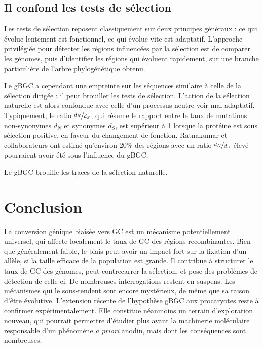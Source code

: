 \documentclass[11pt, oneside]{scrartcl}
\begin{document}
\subsection{Il confond les tests de sélection}
\label{sec:orgheadline16}
Les tests de sélection reposent classiquement sur deux principes généraux
\cite{hurst_genetics_2009} : ce qui évolue lentement est fonctionnel, ce qui
évolue vite est adaptatif. L'approche privilégiée pour détecter les régions
influencées par la sélection est de comparer les génomes, puis d'identifier les
régions qui évoluent rapidement, sur une branche particulière de l'arbre
phylogénétique obtenu\cite{ratnakumar_detecting_2010}.

Le gBGC a cependant une empreinte sur les séquences similaire à celle de la
sélection dirigée : il peut brouiller les tests de sélection. L'action de la
sélection naturelle est alors confondue avec celle d'un processus neutre voir
mal-adaptatif. Typiquement, le ratio \(\nicefrac{d_N}{d_S}\), qui résume le
rapport entre le taux de mutations non-synonymes \(d_N\) et synonymes \(d_S\), est
supérieur à 1 lorsque la protéine est sous sélection positive, en faveur du
changement de fonction. Ratnakumar et collaborateurs ont estimé qu'environ 20\%
des régions avec un ratio \(\nicefrac{d_N}{d_S}\) élevé pourraient avoir été sous
l'influence du gBGC. 

Le gBGC brouille les traces de la sélection naturelle.  
\section*{Conclusion}
\label{sec:orgheadline18}
La conversion génique biaisée vers GC est un mécanisme potentiellement
universel, qui affecte localement le taux de GC des régions recombinantes. Bien
que généralement faible, le biais peut avoir un impact fort sur la fixation d'un
allèle, si la taille efficace de la population est grande. Il contribue à
structurer le taux de GC des génomes, peut contrecarrer la sélection, et pose
des problèmes de détection de celle-ci. De nombreuses interrogations restent en
suspens. Les mécanismes qui le sous-tendent sont encore mystérieux, de même que
sa raison d'être évolutive. L'extension récente de l'hypothèse gBGC aux
procaryotes reste à confirmer expérimentalement. Elle constitue néanmoins un
terrain d'exploration nouveau, qui pourrait permettre d'étudier plus avant la
machinerie moléculaire responsable d'un phénomène \emph{a priori} anodin, mais dont
les conséquences sont nombreuses. 


\end{document}
